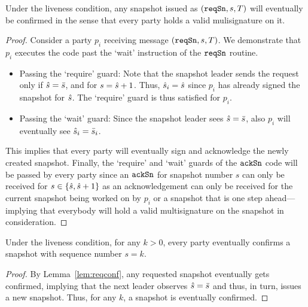 \begin{lemma}\label{lem:reqconf}  
  Under the liveness condition, any snapshot issued as $(\mathtt{reqSn},s,T)$ will eventually be confirmed
  in the sense that every party holds a valid mulisignature on it.
\end{lemma}
\begin{proof}
  Consider a party $p_i$ receiving message $(\mathtt{reqSn},s,T)$. We demonstrate that $p_i$ executes
  the code past the `wait' instruction of the $\mathtt{reqSn}$ routine. 

  \begin{itemize}
   \item Passing the `require' guard:
  Note that the snapshot leader sends the request only if $\hat s=\bar s$, and for $s=\hat s+1$.
  Thus, $\hat s_i=\hat s$ since $p_i$ has already signed the snapshot for $\hat s$. The `require'
  guard is thus satisfied for $p_i$.

   \item Passing the `wait' guard:
  Since the snapshot leader sees $\hat s=\bar s$, also $p_i$ will eventually see $\hat s_i=\bar s_i$. 
  \end{itemize}

  This implies that every party will eventually sign and acknowledge the newly created snapshot.
  Finally, the `require' and `wait' guards of the $\mathtt{ackSn}$ code will be passed by every party
  since an $\mathtt{ackSn}$ for snapshot number $s$ can only be received for $s\in\{\hat s,\hat s+1\}$
  as an acknowledgement can only be received for the current snapshot being worked on by $p_i$
  or a snapshot that is one step ahead---implying that everybody will hold a valid multisignature
  on the snapshot in consideration.
\end{proof}

\begin{lemma}\label{lem:eternal}
  Under the liveness condition, for any $k>0$, every party eventually confirms
  a snapshot with sequence number $s=k$.
\end{lemma}
\begin{proof}
  By Lemma~\ref{lem:reqconf}, any requested snapshot eventually gets confirmed, implying
  that the next leader observes $\hat s=\bar s$ and thus, in turn, issues a new snapshot.
  Thus, for any $k$, a snapshot is eventually confirmed.
\end{proof}

